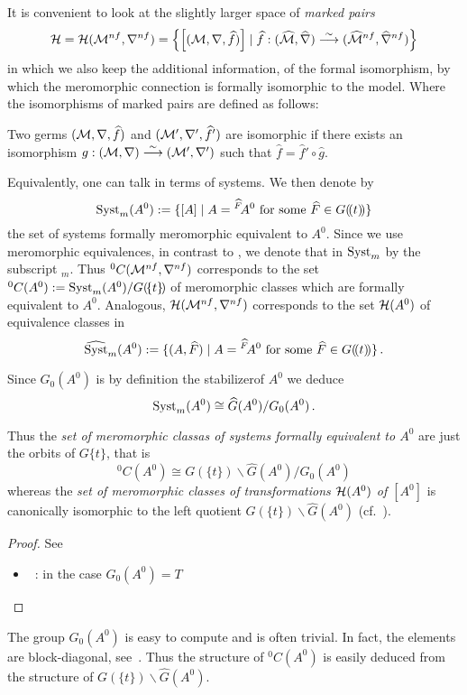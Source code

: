 It is convenient to look at the slightly larger space of \emph{marked pairs}
\[
  \mathcal{H}=\mathcal{H}(\mathcal{M}^{nf},\nabla^{nf})=\left\{
    \left[(\mathcal{M},\nabla,\widehat f)\right]
      \mid
      \widehat f:(\widehat{\mathcal{M}},\widehat\nabla)
        \overset{\sim}\longrightarrow
        (\widehat{\mathcal{M}}^{nf},\widehat\nabla^{nf})
  \right\}
\]
in which we also keep the additional information, of the formal isomorphism, by
which the meromorphic connection is formally isomorphic to the model.
Where the isomorphisms of marked pairs are defined as follows:
\begin{defn}
  Two germs $(\mathcal{M},\nabla,\widehat f)$ and $(\mathcal{M}',\nabla',\widehat f')$ are
  isomorphic if there exists an isomorphism
  $g:(\mathcal{M},\nabla)\overset{\sim}\longrightarrow(\mathcal{M}',\nabla')$ such that
  $\hat f=\hat f'\circ \hat g$.
  \begin{comment}
    \cite[111]{sabbah2007isomonodromic}:\dots it is important to remark that
    such an isomorphism is then unique.
  \end{comment}
\end{defn}

Equivalently, one can talk in terms of systems. We then denote by
\[
  \operatorname{Syst}_m(A^0):=\{[A]
    \mid A={}^{\widehat F}\!A^0 \text{ for some } \widehat F\in G(\!(t)\!)\}
\]
the set of systems formally meromorphic equivalent to $A^0$.
Since we use meromorphic equivalences, in contrast to \cite{boalch,thboalch},
we denote that in $\operatorname{Syst}_m$ by the subscript ${}_m$.
Thus ${}^0C(\mathcal{M}^{nf},\nabla^{nf})$ corresponds to
the set ${}^0C(A^0):=\operatorname{Syst}_m(A^0)/G(\!\{t\}\!)$ of meromorphic classes which
are formally equivalent to $A^0$.
Analogous, $\mathcal{H}(\mathcal{M}^{nf},\nabla^{nf})$ corresponds to the set $\mathcal{H}(A^0)$ of
equivalence classes in
\[
  \widehat{\operatorname{Syst}}_m(A^0):=\{(A,\widehat F)
    \mid A={}^{\widehat F}\!A^0 \text{ for some } \widehat F\in G(\!(t)\!)\} \,.
\]

\begin{lem}
  Since $G_0(A^0)$ is by definition the stabilizer\TODO[correct?] of $A^0$ we
  deduce
  \[
    \operatorname{Syst}_m(A^0)\cong \widehat G(A^0)/G_0(A^0) \,.
  \]
  \begin{s-cor}
    Thus the \emph{set of meromorphic classas of systems formally equivalent
      to $A^0$} are just the orbits of $G\{t\}$, that is
    \[
      {}^0C(A^0)\cong G(\!\{t\}\!)\backslash\hat G(A^0)/G_0(A^0)
    \]
    whereas the \emph{set of meromorphic classes of transformations $\mathcal{H}(A^0)$
    of $[A^0]$} is canonically isomorphic to the left quotient
    $G(\!\{t\}\!)\backslash\hat G(A^0)$ (cf.\ \cite[Lem.1.17]{thboalch}).
  \end{s-cor}
\end{lem}
\begin{proof}
  See
  \begin{itemize}
    \item~\cite[6]{thboalch}: in the case $G_0(A^0)=T$
  \end{itemize}
\end{proof}

The group $G_0(A^0)$ is easy to compute and is often trivial. In fact, the
elements are block-diagonal, see~\cite[77]{Loday2014}.
Thus the structure of ${}^0C(A^0)$ is easily deduced from the structure of
$G(\!\{t\}\!)\backslash\hat G(A^0)$.
